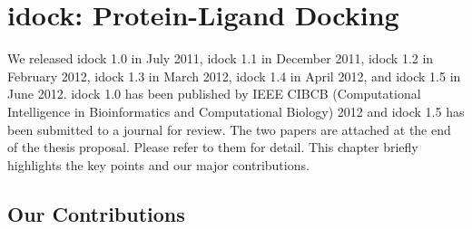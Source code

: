 \chapter{idock: Protein-Ligand Docking}

We released idock 1.0 in July 2011, idock 1.1 in December 2011, idock 1.2 in February 2012, idock 1.3 in March 2012, idock 1.4 in April 2012, and idock 1.5 in June 2012. idock 1.0 has been published by IEEE CIBCB (Computational Intelligence in Bioinformatics and Computational Biology) 2012 and idock 1.5 has been submitted to a journal for review. The two papers are attached at the end of the thesis proposal. Please refer to them for detail. This chapter briefly highlights the key points and our major contributions.

\section{Our Contributions}



\chapterend
